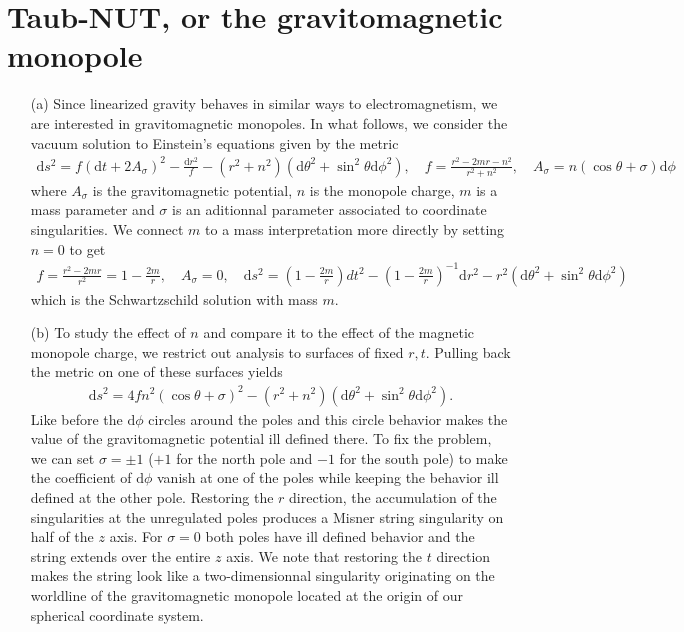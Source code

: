 \documentclass[10pt, a4paper]{article}
\begin{document}
{\section{Taub-NUT, or the gravitomagnetic monopole}
\begin{enumerate}
  \item[(a)] Since linearized gravity behaves in similar ways to electromagnetism, we are interested in gravitomagnetic monopoles. In what follows, we consider the vacuum solution to Einstein's equations given by the metric
  \begin{align*}
    \text{d} s^2=f\left(\text{d} t+2 A_\sigma\right)^2-\frac{\text{d} r^2}{f}-\left(r^2+n^2\right)\left(\text{d} \theta^2+\sin ^2 \theta \text{d} \phi^2\right), \quad f=\frac{r^2-2 m r-n^2}{r^2+n^2}, \quad A_\sigma=n(\cos \theta+\sigma) \text{d} \phi
  \end{align*}
  where $A_{\sigma}$ is the gravitomagnetic potential, $n$ is the monopole charge, $m$ is a mass parameter and $\sigma$ is an aditionnal parameter associated to coordinate singularities. We connect $m$ to a mass interpretation more directly by setting $n=0$ to get 
  \begin{align*}
    f=\frac{r^2-2 m r}{r^2} = 1-\frac{2m}{r}, \quad A_\sigma=0, \quad \text{d} s^2= \left(1-\frac{2m}{r}\right) d t^2-\left(1-\frac{2m}{r}\right)^{-1}\text{d} r^2 - r^2\left(\text{d} \theta^2+\sin ^2 \theta \text{d} \phi^2\right)
  \end{align*}
  which is the Schwartzschild solution with mass $m$.
  \item[(b)] To study the effect of $n$ and compare it to the effect of the magnetic monopole charge, we restrict out analysis to surfaces of fixed $r, t$. Pulling back the metric on one of these surfaces yields 
  \begin{align*}
    \text{d} s^2=4 f n^2 (\cos \theta+\sigma)^2-\left(r^2+n^2\right)\left(\text{d} \theta^2+\sin ^2 \theta \text{d} \phi^2\right).
  \end{align*}
  Like before the $\text{d}\phi$ circles around the poles and this circle behavior makes the value of the gravitomagnetic potential ill defined there. To fix the problem, we can set $\sigma = \pm 1$ ($+1$ for the north pole and $-1$ for the south pole) to make the coefficient of $\text{d}\phi$ vanish at one of the poles while keeping the behavior ill defined at the other pole. Restoring the $r$ direction, the accumulation of the singularities at the unregulated poles produces a Misner string singularity on half of the $z$ axis. For $\sigma = 0$ both poles have ill defined behavior and the string extends over the entire $z$ axis. We note that restoring the $t$ direction makes the string look like a two-dimensionnal singularity originating on the worldline of the gravitomagnetic monopole located at the origin of our spherical coordinate system. 

\end{enumerate}}
\end{document}
